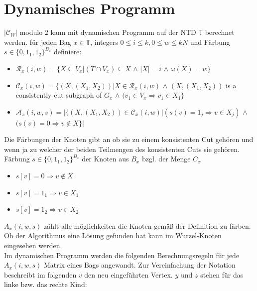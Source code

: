 \section{Dynamisches Programm}
\label{sec:dynP}

$|\mathcal{C}_W|$ modulo $2$ kann mit dynamischen Programm auf der NTD $\mathbb{T}$ berechnet werden.
für jeden Bag $x \in \mathbb{T}$, integers $0 \leq i \leq k,0 \leq w \leq kN$ und Färbung $s \in \{0,1_1,1_2 \}^{B_x}$ definiere:
\begin{itemize}
\item $\mathcal{R}_x(i,w)=\{X \subseteq V_x | (T \cap V_x) \subseteq X$ $\wedge$ $|X| = i$ $\wedge$ $\omega (X) = w \}$
\item $\mathcal{C}_x (i,w) =\{ (X,(X_1,X_2)) | X \in \mathcal{R}_x(i,w)$ $\wedge$ $(X,(X_1,X_2))$ is a consistently cut subgraph of $G_x$ $\wedge$ $(v_1 \in V_x \Rightarrow v_1 \in X_1 \} $
\item $\mathcal{A}_x(i,w,s)=| \{ (X,(X_1,X_2)) \in \mathcal{C}_x(i,w) | (s(v) = 1_j \Rightarrow v \in X_j)$ $\wedge$ $(s(v)=0 \Rightarrow v \notin X \} |$
\end{itemize}
Die Färbungen der Knoten gibt an ob sie zu einem konsistenten Cut gehören und wenn ja zu welcher der beiden Teilmengen des konsistenten Cuts sie gehören.
Färbung $s \in \{0,1_1,1_2 \}^{B_x}$  der Knoten aus $B_x$ bzgl. der Menge $C_x$
\begin{itemize}
\item $s[v] = 0 \Rightarrow v \notin X$
\item $s[v] = 1_1 \Rightarrow v \in X_1$ 
\item $s[v] = 1_2 \Rightarrow v \in X_2$ 
\end{itemize}
$A_x(i,w,s)$ zählt alle möglichkeiten die Knoten gemäß der Definition zu färben.
Ob der Algorithmus eine Lösung gefunden hat kann im Wurzel-Knoten eingesehen werden.\\
Im dynamischen Programm werden die folgenden Berechnungsregeln für jede $A_x(i,w,s)$ Matrix eines Bags angewandt. Zur Vereinfachung der Notation beschreibt im folgenden $v$ den neu eingeführten Vertex. $y$ und $z$ stehen für das linke bzw. das rechte Kind:
